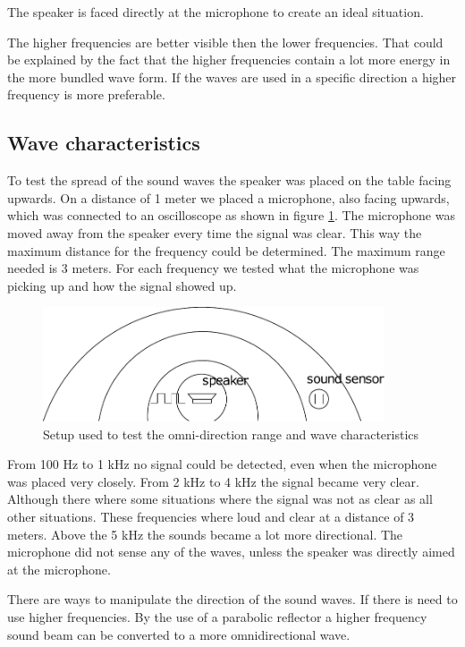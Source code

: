 \documentclass[10pt,a4paper]{article}
\begin{document}
The speaker is faced directly at the microphone to create an ideal situation. 

The higher frequencies are better visible then the lower frequencies. That could be explained by the fact that the higher frequencies contain a lot more energy in the more bundled wave form. If the waves are used in a specific direction a higher frequency is more preferable.  

\subsection{Wave characteristics}

To test the spread of the sound waves the speaker was placed on the table facing upwards. On a distance of 1 meter we placed a microphone, also facing upwards, which was connected to an oscilloscope as shown in figure \ref{setup2}. The microphone was moved away from the speaker every time the signal was clear. This way the maximum distance for the frequency could be determined. The maximum range needed is 3 meters. For each frequency we tested what the microphone was picking up and how the signal showed up. 

\begin{figure}[H]
\centering
\includegraphics[width=0.9\textwidth]{situation2.pdf}
\caption{Setup used to test the omni-direction range and wave characteristics} 
\label{setup2}
\end{figure}

From 100 Hz to 1 kHz no signal could be detected, even when the microphone was placed very closely. From 2 kHz to 4 kHz the signal became very clear. Although there where some situations where the signal was not as clear as all other situations. These frequencies where loud and clear at a distance of 3 meters. Above the 5 kHz the sounds became a lot more directional. The microphone did not sense any of the waves, unless the speaker was directly aimed at the microphone. 
 
There are ways to manipulate the direction of the sound waves. If there is need to use higher frequencies. By the use of a parabolic reflector a higher frequency sound beam can be converted to a more omnidirectional wave. 
\end{document}
